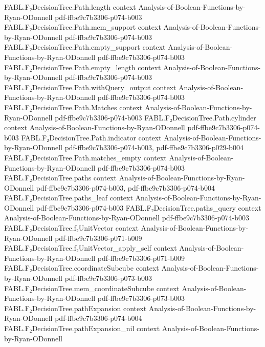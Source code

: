 \begin{theorem}
  {FABL.F₂DecisionTree.Path.length}
  {context}
  {Analysis-of-Boolean-Functions-by-Ryan-ODonnell}
  {pdf-ffbe9c7b3306-p074-b003}
\proofstep
  {FABL.F₂DecisionTree.Path.mem_support}
  {context}
  {Analysis-of-Boolean-Functions-by-Ryan-ODonnell}
  {pdf-ffbe9c7b3306-p074-b003}
\proofstep
  {FABL.F₂DecisionTree.Path.empty_support}
  {context}
  {Analysis-of-Boolean-Functions-by-Ryan-ODonnell}
  {pdf-ffbe9c7b3306-p074-b003}
\proofstep
  {FABL.F₂DecisionTree.Path.empty_length}
  {context}
  {Analysis-of-Boolean-Functions-by-Ryan-ODonnell}
  {pdf-ffbe9c7b3306-p074-b003}
\proofstep
  {FABL.F₂DecisionTree.Path.withQuery_output}
  {context}
  {Analysis-of-Boolean-Functions-by-Ryan-ODonnell}
  {pdf-ffbe9c7b3306-p074-b003}
\proofstep
  {FABL.F₂DecisionTree.Path.Matches}
  {context}
  {Analysis-of-Boolean-Functions-by-Ryan-ODonnell}
  {pdf-ffbe9c7b3306-p074-b003}
\proofstep
  {FABL.F₂DecisionTree.Path.cylinder}
  {context}
  {Analysis-of-Boolean-Functions-by-Ryan-ODonnell}
  {pdf-ffbe9c7b3306-p074-b003}
\proofstep
  {FABL.F₂DecisionTree.Path.indicator}
  {context}
  {Analysis-of-Boolean-Functions-by-Ryan-ODonnell}
  {pdf-ffbe9c7b3306-p074-b003,
    pdf-ffbe9c7b3306-p029-b004}
\proofstep
  {FABL.F₂DecisionTree.Path.matches_empty}
  {context}
  {Analysis-of-Boolean-Functions-by-Ryan-ODonnell}
  {pdf-ffbe9c7b3306-p074-b003}
\proofstep
  {FABL.F₂DecisionTree.paths}
  {context}
  {Analysis-of-Boolean-Functions-by-Ryan-ODonnell}
  {pdf-ffbe9c7b3306-p074-b003,
    pdf-ffbe9c7b3306-p074-b004}
\proofstep
  {FABL.F₂DecisionTree.paths_leaf}
  {context}
  {Analysis-of-Boolean-Functions-by-Ryan-ODonnell}
  {pdf-ffbe9c7b3306-p074-b003}
\proofstep
  {FABL.F₂DecisionTree.paths_query}
  {context}
  {Analysis-of-Boolean-Functions-by-Ryan-ODonnell}
  {pdf-ffbe9c7b3306-p074-b003}
\proofstep
  {FABL.F₂DecisionTree.f₂UnitVector}
  {context}
  {Analysis-of-Boolean-Functions-by-Ryan-ODonnell}
  {pdf-ffbe9c7b3306-p071-b009}
\proofstep
  {FABL.F₂DecisionTree.f₂UnitVector_apply_self}
  {context}
  {Analysis-of-Boolean-Functions-by-Ryan-ODonnell}
  {pdf-ffbe9c7b3306-p071-b009}
\proofstep
  {FABL.F₂DecisionTree.coordinateSubcube}
  {context}
  {Analysis-of-Boolean-Functions-by-Ryan-ODonnell}
  {pdf-ffbe9c7b3306-p073-b003}
\proofstep
  {FABL.F₂DecisionTree.mem_coordinateSubcube}
  {context}
  {Analysis-of-Boolean-Functions-by-Ryan-ODonnell}
  {pdf-ffbe9c7b3306-p073-b003}
\proofstep
  {FABL.F₂DecisionTree.pathExpansion}
  {context}
  {Analysis-of-Boolean-Functions-by-Ryan-ODonnell}
  {pdf-ffbe9c7b3306-p074-b004}
\proofstep
  {FABL.F₂DecisionTree.pathExpansion_nil}
  {context}
  {Analysis-of-Boolean-Functions-by-Ryan-ODonnell}

\end{theorem}
